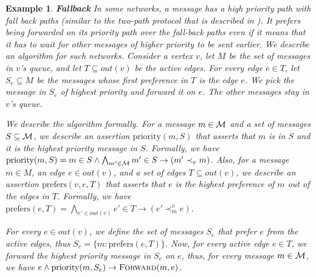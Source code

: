 \documentclass[11pt,eepic]{article}
\newcommand{\set}[1]{\{ #1  \}}
\newcommand{\M}{{\cal M}}
\newcommand{\Forw}{\mbox{\sc Forward}}
\newtheorem{exmpl}[theorem]{Example}
\newenvironment{example}{\begin{exmpl}\rm}{\hspace{\stretch{1}}\end{exmpl}}
\begin{document}
	\begin{example} {\bf Fallback}
	\label{ex:fallback}
		In some networks, a message has a high priority path with fall back paths (similar to the two-path protocol that is described in \cite{emsoft}). It prefers being forwarded on its priority path over the fall-back paths even if it means that it has to wait for other messages of higher priority to be sent earlier. We describe an algorithm for such networks. Consider a vertex $v$, let $M$ be the set of messages in $v$'s queue, and let $T \subseteq out(v)$ be the active edges. For every edge $e \in T$, let $S_e \subseteq M$ be the messages whose first preference in $T$ is the edge $e$. We pick the message in $S_e$ of highest priority and forward it on $e$. The other messages stay in $v$'s queue.

		We describe the algorithm formally. For a message $m \in \M$ and a set of messages $S \subseteq \M$, we describe an assertion $\mbox{priority}(m, S)$ that asserts that $m$ is in $S$ and it is the highest priority message in $S$. Formally, we have $\mbox{priority}(m, S) = m\in S \wedge \bigwedge_{m' \in \M} m' \in S \rightarrow (m' \prec_v m)$. Also, for a message $m \in M$, an edge $e \in out(v)$, and a set of edges $T \subseteq out(v)$, we describe an assertion $\mbox{prefers}(v, e, T)$ that asserts that $e$ is the highest preference of $m$ out of the edges in $T$. Formally, we have $\mbox{prefers}(e, T) = \bigwedge_{e' \in out(v)} e' \in T \rightarrow (e' \prec_m^v e)$.

		For every $e \in out(v)$, we define the set of messages $S_e$ that prefer $e$ from the active edges, thus $S_e = \set{m :  \mbox{prefers}(e, T)}$. Now, for every active edge $e \in T$, we forward the highest priority message in $S_e$ on $e$, thus, for every message $m \in \M$, we have $e \wedge \mbox{priority}(m, S_e) \rightarrow \Forw(m, e)$.
		\end{example}
\end{document}
